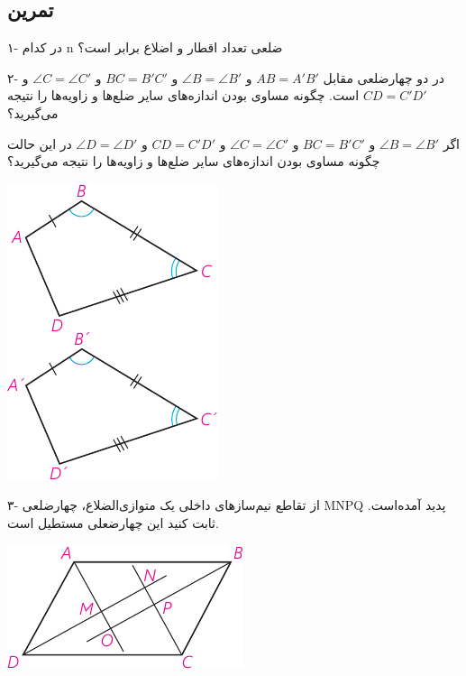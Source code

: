 \documentclass[12pt, a4paper]{book}
\newenvironment{Figure}
{\par\medskip\noindent\minipage{\linewidth}}
{\endminipage\par\medskip}
\begin{document}
\subsection{تمرین}
	\begin{multicols}{2}
			{\medium ۱-} در کدام n ضلعی تعداد اقطار و اضلاع برابر است؟
			\bigskip
			
				{\medium ۲- }در دو چهارضلعی مقابل 
			$ AB = A'B' $
			و
			$ \angle B = \angle B' $
			و
			$ BC = B'C' $
			و
			$ \angle C = \angle C' $
			و
			$ CD = C'D' $
			است. چگونه مساوی بودن اندازه‌های سایر ضلع‌ها و زاویه‌ها را نتیجه می‌گیرید؟
			
			اگر 
			$ \angle B = \angle B' $
			و
			$ BC = B'C' $
			و
			$ \angle C = \angle C' $
			و
			$ CD = C'D' $
			و
			$ \angle D = \angle D' $
			در این حالت چگونه مساوی بودن اندازه‌های سایر ضلع‌ها و زاویه‌ها را نتیجه می‌گیرید؟

		\begin{Figure}
			\centering
			\includegraphics[scale=1.2]{"Shapes/Fasl - 3/Dars 1/PDFs/P63-S3,4.pdf"}
		\end{Figure}

\bigskip
				{\medium ۳-} از تقاطع نیم‌سازهای داخلی یک متوازی‌الضلاع، چهارضلعی
			MNPQ
			پدید آمده‌است. ثابت کنید این چهارضعلی مستطیل است.
			




		\begin{Figure}
			\centering
			\includegraphics[scale=1.2]{"Shapes/Fasl - 3/Dars 1/PDFs/P63-S5.pdf"}
		\end{Figure}


\end{multicols}
\end{document}
